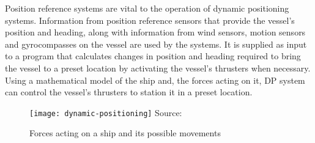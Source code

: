 

Position reference systems are vital to the operation of dynamic positioning systems. Information from position reference sensors that provide the vessel’s position and heading, along with information from wind sensors, motion sensors and gyrocompasses on the vessel are used by the systems. It is supplied as input to a program that calculates changes in position and heading required to bring the vessel to a preset location by activating the vessel’s thrusters when necessary. Using a mathematical model of the ship and, the forces acting on it, DP system can control the vessel's thrusters to station it in a preset location.

%
%

\begin{figure}
	\centering
	\caption{Forces acting on a ship and its possible movements}
	\texttt{[image: dynamic-positioning]}
	\hbox{\small Source: }
	\label{fig:shipforces}
\end{figure}


